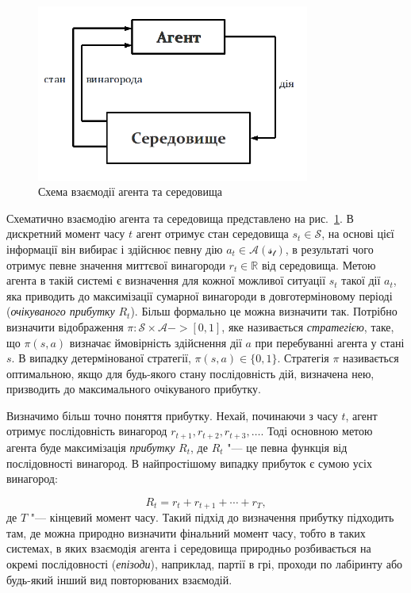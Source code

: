 \documentclass[a4paper,10pt]{article}
\begin{document}
\begin{figure}
\label{agent_env_diagram}
\includegraphics[width=0.8\textwidth]{agent_env_diagram.png}
\caption{Схема взаємодії агента та середовища}
\end{figure}
Схематично взаємодію агента та середовища представлено на рис.~\ref{agent_env_diagram}. В дискретний момент часу $t$ агент отримує стан середовища $s_t \in \mathcal{S}$, на основі цієї інформації він вибирає і здійснює певну дію $a_t \in \mathcal{A(s_t)}$, в результаті чого отримує певне значення миттєвої винагороди $r_t \in \mathbb{R}$ від середовища. Метою агента в такій системі є визначення для кожної можливої ситуації $s_t$ такої дії $a_t$, яка приводить до максимізації сумарної винагороди в довготерміновому періоді (\emph{очікуваного прибутку} $R_t$). Більш формально це можна визначити так. Потрібно визначити відображення $\pi:\mathcal{S}\times\mathcal{A} -> [0,1]$, яке називається \emph{стратегією}, таке, що $\pi(s, a)$ визначає ймовірність здійснення дії $a$ при перебуванні агента у стані $s$. В випадку детермінованої стратегії, $\pi(s,a) \in \{0,1\}$. Стратегія $\pi$ називається оптимальною, якщо для будь-якого стану послідовність дій, визначена нею, призводить до максимального очікуваного прибутку.

Визначимо більш точно поняття прибутку. Нехай, починаючи з часу $t$, агент отримує послідовність винагород $r_{t+1}, r_{t+2}, r_{t+3}, \ldots$. Тоді основною метою агента буде максимізація \emph{прибутку} $R_t$, де $R_t$ "--- це певна функція від послідовності винагород. В найпростішому випадку прибуток є сумою усіх винагород:

\begin{equation}
R_t = r_{t} + r_{t+1} + \cdots + r_T,
\end{equation}
де $T$ "--- кінцевий момент часу. Такий підхід до визначення прибутку підходить там, де можна природно визначити фінальний момент часу, тобто в таких системах, в яких взаємодія агента і середовища природньо розбивається на окремі послідовності (\emph{епізоди}), наприклад, партії в грі, проходи по лабіринту або будь-який інший вид повторюваних взаємодій.
\end{document}
